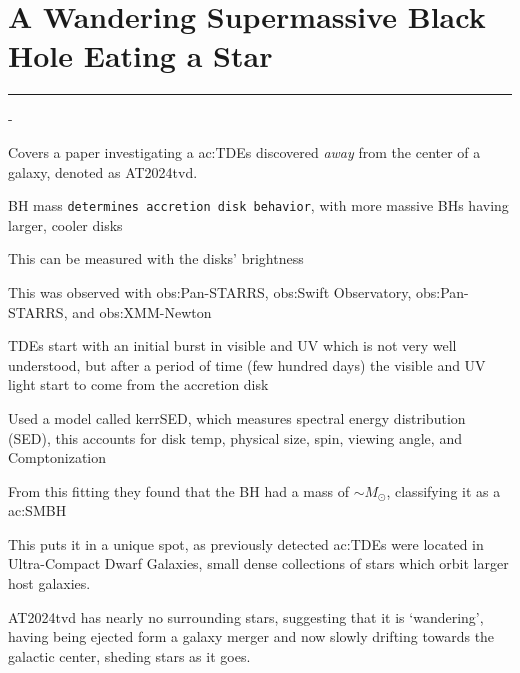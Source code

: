 \pagebreak
\chapter{A Wandering Supermassive Black Hole Eating a Star \cite{Saad2026} \label{chap:AWanderingSupermassiveBlackHoleEatingaStar}}
\hrule
\vspace{.5cm}

\begin{list}{-}{}
\item Covers a paper investigating a \gls{ac:TDE}s discovered \textit{away} from the center of a galaxy, denoted as AT2024tvd.
\item BH mass \texttt{determines accretion disk behavior}, with more massive BHs having larger, cooler disks
\item This can be measured with the disks' brightness  
\item This was observed with \gls{obs:Pan-STARRS}, \gls{obs:Swift Observatory}, \gls{obs:Pan-STARRS}, and \gls{obs:XMM-Newton}
\item TDEs start with an initial burst in visible and UV which is not very well understood, but after a period of time (few hundred days) the visible and UV light start to come from the accretion disk
\item Used a model called kerrSED, which measures spectral energy distribution (SED), this accounts for disk temp, physical size, spin, viewing angle, and \gls{Comptonization}
\item From this fitting they found that the BH had a mass of \(\sim M_\odot\), classifying it as a \gls{ac:SMBH}  
\item This puts it in a unique spot, as previously detected \gls{ac:TDE}s were located in Ultra-Compact Dwarf Galaxies, small dense collections of stars which orbit larger host galaxies.
\item AT2024tvd has nearly no surrounding stars, suggesting that it is `wandering', having being ejected form a galaxy merger and now slowly drifting towards the galactic center, sheding stars as it goes.   
\end{list}


